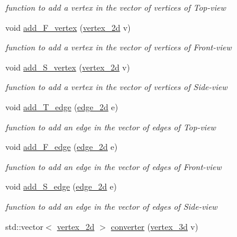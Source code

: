 \begin{DoxyCompactItemize}
\begin{DoxyCompactList}\small\item\em function to add a vertex in the vector of vertices of Top-\/view \end{DoxyCompactList}\item 
void \hyperlink{classobject__2d_af46c50b2bcb0fd9188b35b818c960e8d}{add\+\_\+\+F\+\_\+vertex} (\hyperlink{classvertex__2d}{vertex\+\_\+2d} v)
\begin{DoxyCompactList}\small\item\em function to add a vertex in the vector of vertices of Front-\/view \end{DoxyCompactList}\item 
void \hyperlink{classobject__2d_a49f8d6d9a110979ac19eb40817d4d0ca}{add\+\_\+\+S\+\_\+vertex} (\hyperlink{classvertex__2d}{vertex\+\_\+2d} v)
\begin{DoxyCompactList}\small\item\em function to add a vertex in the vector of vertices of Side-\/view \end{DoxyCompactList}\item 
void \hyperlink{classobject__2d_adfe9c8ca6c38cf14338c1e37bb4fcc1f}{add\+\_\+\+T\+\_\+edge} (\hyperlink{classedge__2d}{edge\+\_\+2d} e)
\begin{DoxyCompactList}\small\item\em function to add an edge in the vector of edges of Top-\/view \end{DoxyCompactList}\item 
void \hyperlink{classobject__2d_ac6449512672c0ff45ca163c374b85466}{add\+\_\+\+F\+\_\+edge} (\hyperlink{classedge__2d}{edge\+\_\+2d} e)
\begin{DoxyCompactList}\small\item\em function to add an edge in the vector of edges of Front-\/view \end{DoxyCompactList}\item 
void \hyperlink{classobject__2d_a85c014c6fbb2c21ef42a06711dd0a277}{add\+\_\+\+S\+\_\+edge} (\hyperlink{classedge__2d}{edge\+\_\+2d} e)
\begin{DoxyCompactList}\small\item\em function to add an edge in the vector of edges of Side-\/view \end{DoxyCompactList}\item 
std\+::vector$<$ \hyperlink{classvertex__2d}{vertex\+\_\+2d} $>$ \hyperlink{classobject__2d_a68a06e7feae6a6cae1803f54b8a3a07b}{converter} (\hyperlink{classvertex__3d}{vertex\+\_\+3d} v)

\end{DoxyCompactItemize}
